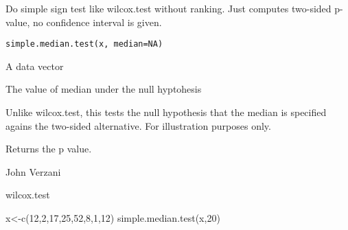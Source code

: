 \begin{Description}\relax
Do simple sign test like wilcox.test without ranking. Just computes
two-sided p-value, no confidence interval is given.
\end{Description}
\begin{Usage}
\begin{verbatim}
simple.median.test(x, median=NA)
\end{verbatim}
\end{Usage}
\begin{Arguments}
\begin{ldescription}
\item[\code{x}] A data vector 
\item[\code{median}] The value of median under the null hyptohesis 
\end{ldescription}
\end{Arguments}
\begin{Details}\relax
Unlike wilcox.test, this tests the null hypothesis that the median is
specified agains the two-sided alternative. For illustration purposes
only.
\end{Details}
\begin{Value}
Returns the p value.
\end{Value}
\begin{Author}\relax
John Verzani
\end{Author}
\begin{SeeAlso}\relax
wilcox.test
\end{SeeAlso}
\begin{Examples}
\begin{ExampleCode}
x<-c(12,2,17,25,52,8,1,12)
simple.median.test(x,20)
\end{ExampleCode}
\end{Examples}


